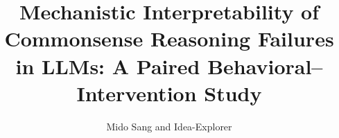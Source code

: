 \documentclass{article}
\title{Mechanistic Interpretability of Commonsense Reasoning Failures in LLMs: A Paired Behavioral--Intervention Study}
\author{Mido Sang and Idea-Explorer}
\begin{document}
\maketitle

\begin{abstract}

\end{abstract}









\end{document}
